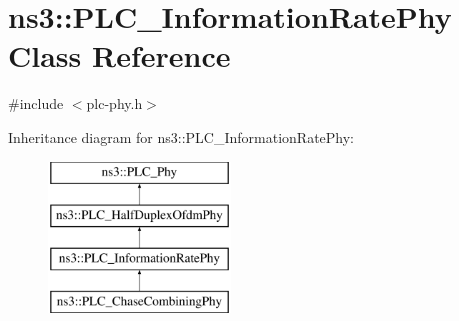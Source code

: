 \hypertarget{classns3_1_1PLC__InformationRatePhy}{\section{ns3\-:\-:\-P\-L\-C\-\_\-\-Information\-Rate\-Phy \-Class \-Reference}
\label{classns3_1_1PLC__InformationRatePhy}
}


{\ttfamily \#include $<$plc-\/phy.\-h$>$}

\-Inheritance diagram for ns3\-:\-:\-P\-L\-C\-\_\-\-Information\-Rate\-Phy\-:\begin{figure}[H]
\begin{center}
\leavevmode
\includegraphics[height=4.000000cm]{classns3_1_1PLC__InformationRatePhy}
\end{center}
\end{figure}
